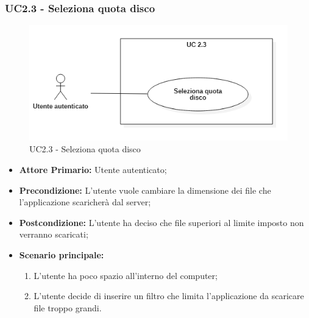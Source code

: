 \subsubsection{UC2.3 - Seleziona quota disco}
\begin{figure}[H]
    \centering
    \includegraphics[scale = 0.7]{components/img/UC2_3.png}
    \caption{UC2.3 - Seleziona quota disco}
\end{figure}
\begin{itemize}
\item \textbf{Attore Primario:} Utente autenticato;
\item \textbf{Precondizione:} L'utente vuole cambiare la dimensione dei file che l'applicazione scaricherà dal server;
\item \textbf{Postcondizione:} L'utente ha deciso che file superiori al limite imposto non verranno scaricati;
\item \textbf{Scenario principale:}
    \begin{enumerate}
    \item L'utente ha poco spazio all'interno del computer;
    \item L'utente decide di inserire un filtro che limita l'applicazione da scaricare file troppo grandi.
    \end{enumerate}
\end{itemize}


